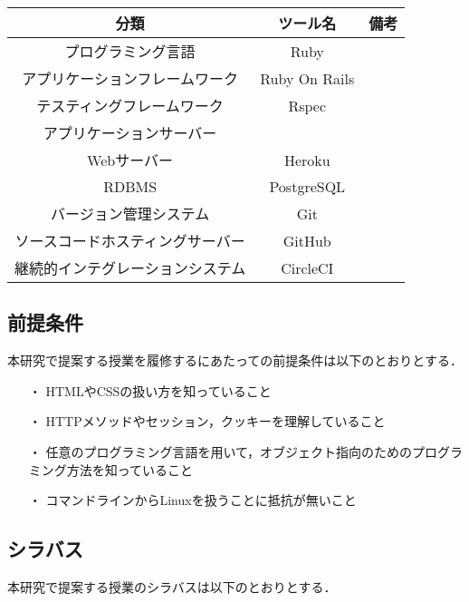 \begin{table}[ht]
  \begin{center}
    \begin{tabular}{|c|c|c|}
      \hline
      分類 & ツール名 & 備考 \\
      \hline
      プログラミング言語 & Ruby & \\
      \hline
      アプリケーションフレームワーク & Ruby On Rails & \\
      \hline
      テスティングフレームワーク & Rspec & \\
      \hline
      アプリケーションサーバー &  & \\
      \cline{1-1}\cline{3-3}
      Webサーバー & Heroku & \\
      \hline
      RDBMS & PostgreSQL & \\
      \hline
      バージョン管理システム & Git & \\
      \hline
      ソースコードホスティングサーバー & GitHub & \\
      \hline
      継続的インテグレーションシステム & CircleCI & \\
      \hline
    \end{tabular}
  \end{center}
\end{table}

\subsection{前提条件}

本研究で提案する授業を履修するにあたっての前提条件は以下のとおりとする．

\begin{itemize}
  \item[・] HTMLやCSSの扱い方を知っていること
  \item[・] HTTPメソッドやセッション，クッキーを理解していること
  \item[・] 任意のプログラミング言語を用いて，オブジェクト指向のためのプログラミング方法を知っていること
  \item[・] コマンドラインからLinuxを扱うことに抵抗が無いこと
\end{itemize}

\subsection{シラバス}

本研究で提案する授業のシラバスは以下のとおりとする．

